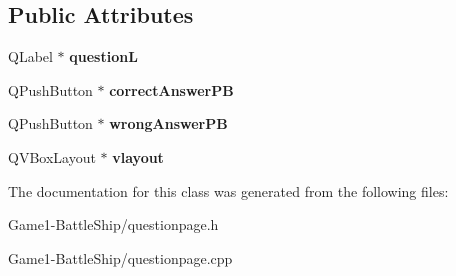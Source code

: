 \subsection*{Public Attributes}
\begin{DoxyCompactItemize}
\item 
\mbox{\label{classQuestionPage_a76b4abc3747e379085607ef98c0b6907}} 
Q\+Label $\ast$ {\bfseries questionL}
\item 
\mbox{\label{classQuestionPage_a57b3b9a39a380b0b61ac28106c813fa1}} 
Q\+Push\+Button $\ast$ {\bfseries correct\+Answer\+PB}
\item 
\mbox{\label{classQuestionPage_aed1e1c5159986ade73742ee79e0cb2b3}} 
Q\+Push\+Button $\ast$ {\bfseries wrong\+Answer\+PB}
\item 
\mbox{\label{classQuestionPage_a3bb573fd39499fad91b1bba794889b78}} 
Q\+V\+Box\+Layout $\ast$ {\bfseries vlayout}
\end{DoxyCompactItemize}


The documentation for this class was generated from the following files\+:\begin{DoxyCompactItemize}
\item 
Game1-\/\+Battle\+Ship/questionpage.\+h\item 
Game1-\/\+Battle\+Ship/questionpage.\+cpp\end{DoxyCompactItemize}
